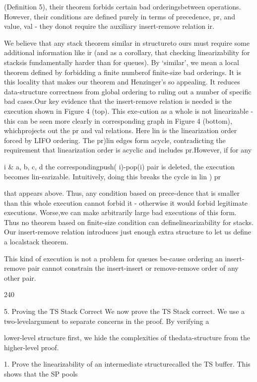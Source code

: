 (Definition 5), their theorem forbids certain bad orderingsbetween operations. However, their conditions are defined
purely in terms of precedence, pr, and value, val - they donot require the auxiliary insert-remove relation ir.

We believe that any stack theorem similar in structureto ours must require some additional information like ir
(and as a corollary, that checking linearizability for stacksis fundamentally harder than for queues). By `similar', we
mean a local theorem defined by forbidding a finite numberof finite-size bad orderings. It is this locality that makes
our theorem and Henzinger's so appealing. It reduces data-structure correctness from global ordering to ruling out a
number of specific bad cases.Our key evidence that the insert-remove relation is
needed is the execution shown in Figure 4 (top). This exe-cution as a whole is not linearizable - this can be seen more
clearly in corresponding graph in Figure 4 (bottom), whichprojects out the pr and val relations. Here lin is the linearization order forced by LIFO ordering. The pr)lin edges form acycle, contradicting the requirement that linearization order
is acyclic and includes pr.However, if for any

i & {a, b, c, d} the correspondingpush(
i)-pop(i) pair is deleted, the execution becomes lin-earizable. Intuitively, doing this breaks the cycle in lin ) pr

that appears above. Thus, any condition based on prece-dence that is smaller than this whole execution cannot forbid
it - otherwise it would forbid legitimate executions. Worse,we can make arbitrarily large bad executions of this form.
Thus no theorem based on finite-size condition can definelinearizability for stacks. Our insert-remove relation introduces just enough extra structure to let us define a localstack theorem.

This kind of execution is not a problem for queues be-cause ordering an insert-remove pair cannot constrain the
insert-insert or remove-remove order of any other pair.

240

5. Proving the TS Stack Correct
We now prove the TS Stack correct. We use a two-levelargument to separate concerns in the proof. By verifying a

lower-level structure first, we hide the complexities of thedata-structure from the higher-level proof.

1. Prove the linearizability of an intermediate structurecalled the TS buffer. This shows that the SP pools

